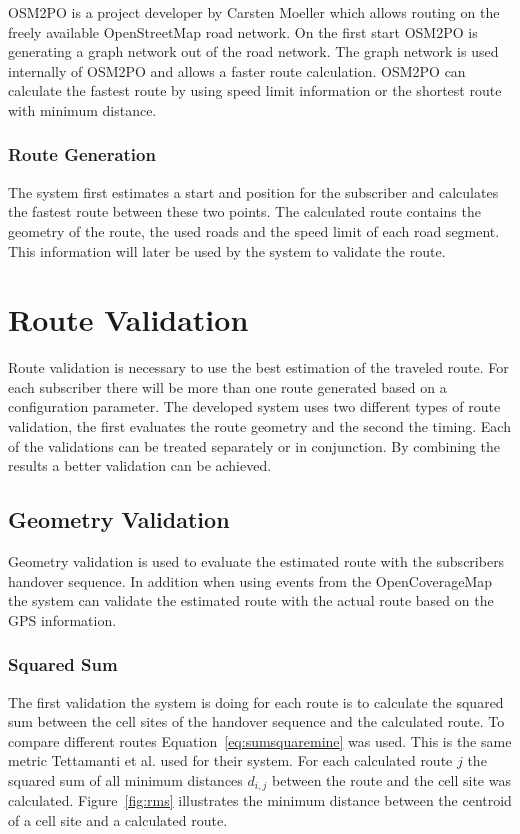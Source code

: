 \documentclass[master,english]{hgbthesis}
\begin{document}
OSM2PO is a project developer by Carsten Moeller which allows routing on the freely available OpenStreetMap road network. On the first start OSM2PO is generating a graph network out of the road network. The graph network is used internally of OSM2PO and allows a faster route calculation. OSM2PO can calculate the fastest route by using speed limit information or the shortest route with minimum distance.

\subsubsection{Route Generation}

The system first estimates a start and position for the subscriber and calculates the fastest route between these two points. The calculated route contains the geometry of the route, the used roads and the speed limit of each road segment. This information will later be used by the system to validate the route.

\section{Route Validation}

\label{sec:routevalidation}

Route validation is necessary to use the best estimation of the traveled route. For each subscriber there will be more than one route generated based on a configuration parameter. The developed system uses two different types of route validation, the first evaluates the route geometry and the second the timing. Each of the validations can be treated separately or in conjunction. By combining the results a better validation can be achieved.

\subsection{Geometry Validation}

Geometry validation is used to evaluate the estimated route with the subscribers handover sequence. In addition when using events from the OpenCoverageMap the system can validate the estimated route with the actual route based on the GPS information.

\subsubsection{Squared Sum}

The first validation the system is doing for each route is to calculate the squared sum between the cell sites of the handover sequence and the calculated route. To compare different routes Equation~\ref{eq:sumsquaremine} was used. This is the same metric Tettamanti et al.\cite{Tettamanti2010} used for their system. For each calculated route $j$ the squared sum of all minimum distances $d_{i,j}$  between the route and the cell site was calculated. Figure~\ref{fig:rms} illustrates the minimum distance between the centroid of a cell site and a calculated route.
\end{document}
